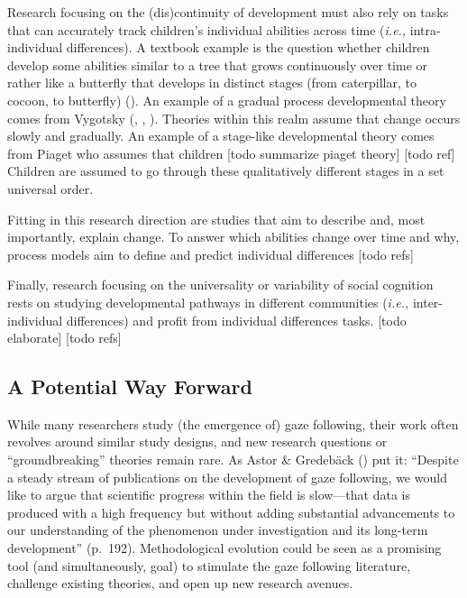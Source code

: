 \documentclass[
]{scrbook}
\begin{document}
Research focusing on the (dis)continuity of development must also rely on tasks that can accurately track children's individual abilities across time (\emph{i.e.,} intra-individual differences). A textbook example is the question whether children develop some abilities similar to a tree that grows continuously over time or rather like a butterfly that develops in distinct stages (from caterpillar, to cocoon, to butterfly) (). An example of a gradual process developmental theory comes from Vygotsky (, , ). Theories within this realm assume that change occurs slowly and gradually. An example of a stage-like developmental theory comes from Piaget who assumes that children {[}todo summarize piaget theory{]} {[}todo ref{]} Children are assumed to go through these qualitatively different stages in a set universal order.

Fitting in this research direction are studies that aim to describe and, most importantly, explain change. To answer which abilities change over time and why, process models aim to define and predict individual differences {[}todo refs{]}

Finally, research focusing on the universality or variability of social cognition rests on studying developmental pathways in different communities (\emph{i.e.,} inter-individual differences) and profit from individual differences tasks. {[}todo elaborate{]} {[}todo refs{]}

\subsection{A Potential Way Forward}\label{a-potential-way-forward}

While many researchers study (the emergence of) gaze following, their work often revolves around similar study designs, and new research questions or ``groundbreaking'' theories remain rare. As Astor \& Gredebäck () put it: ``Despite a steady stream of publications on the development of gaze following, we would like to argue that scientific progress within the field is slow---that data is produced with a high frequency but without adding substantial advancements to our understanding of the phenomenon under investigation and its long-term development'' (p.~192). Methodological evolution could be seen as a promising tool (and simultaneously, goal) to stimulate the gaze following literature, challenge existing theories, and open up new research avenues.
\end{document}
